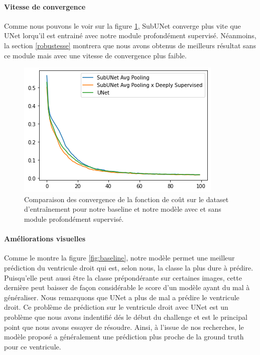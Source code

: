 \documentclass[french, english]{article}
\begin{document}
\paragraph{Vitesse de convergence}
Comme nous pouvons le voir sur la figure \ref{fig:convergence}, SubUNet converge plus vite que UNet lorqu'il est entrainé avec notre module profondément supervisé. Néanmoins, la section \ref{robustesse} montrera que nous avons obtenus de meilleurs résultat sans ce module mais avec une vitesse de convergence plus faible.

\begin{figure}[h]
    \centering
    \includegraphics[scale=0.5]{img/convergence.png}
    \caption{Comparaison des convergence de la fonction de coût sur le dataset d'entraînement pour notre baseline et notre modèle avec et sans module profondément supervisé.}
    \label{fig:convergence}
\end{figure}


\paragraph{Améliorations visuelles}
Comme le montre la figure \ref{fig:baseline}, notre modèle permet une meilleur prédiction du ventricule droit qui est, selon nous, la classe la plus dure à prédire. Puisqu'elle peut aussi être la classe prépondérante sur certaines images, cette dernière peut baisser de façon considérable le score d'un modèle ayant du mal à généraliser. Nous remarquons que UNet a plus de mal a prédire le ventricule droit. Ce problème de prédiction sur le ventricule droit avec UNet est un problème que nous avons indentifié dés le début du challenge et est le principal point que nous avons essayer de résoudre. Ainsi, à l'issue de nos recherches, le modèle proposé a généralement une prédiction plus proche de la ground truth pour ce ventricule.
\end{document}
